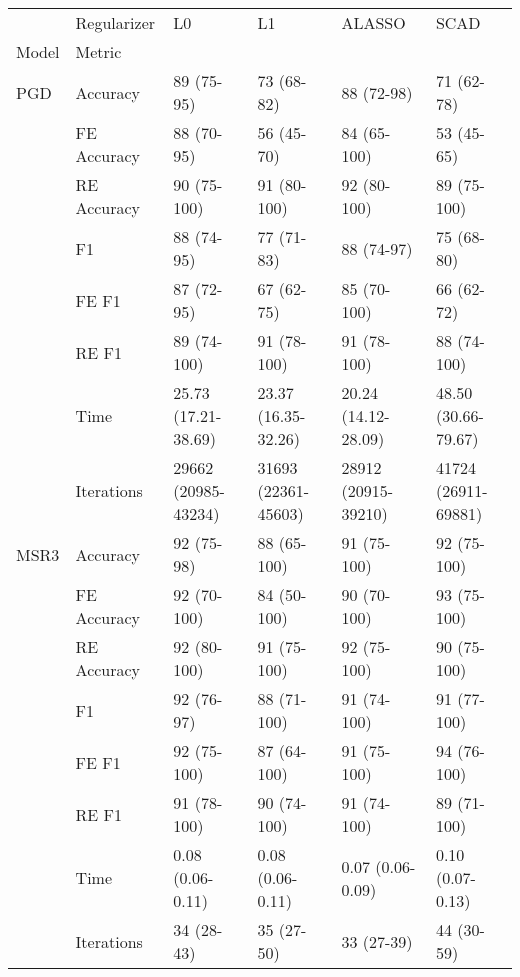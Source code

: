 \begin{tabular}{llllll}
\toprule
    & Regularizer &                   L0 &                   L1 &               ALASSO &                 SCAD \\
Model & Metric &                      &                      &                      &                      \\
\midrule
PGD & Accuracy &           89 (75-95) &           73 (68-82) &           88 (72-98) &           71 (62-78) \\
    & FE Accuracy &           88 (70-95) &           56 (45-70) &          84 (65-100) &           53 (45-65) \\
    & RE Accuracy &          90 (75-100) &          91 (80-100) &          92 (80-100) &          89 (75-100) \\
    & F1 &           88 (74-95) &           77 (71-83) &           88 (74-97) &           75 (68-80) \\
    & FE F1 &           87 (72-95) &           67 (62-75) &          85 (70-100) &           66 (62-72) \\
    & RE F1 &          89 (74-100) &          91 (78-100) &          91 (78-100) &          88 (74-100) \\
    & Time &  25.73 (17.21-38.69) &  23.37 (16.35-32.26) &  20.24 (14.12-28.09) &  48.50 (30.66-79.67) \\
    & Iterations &  29662 (20985-43234) &  31693 (22361-45603) &  28912 (20915-39210) &  41724 (26911-69881) \\
MSR3 & Accuracy &           92 (75-98) &          88 (65-100) &          91 (75-100) &          92 (75-100) \\
    & FE Accuracy &          92 (70-100) &          84 (50-100) &          90 (70-100) &          93 (75-100) \\
    & RE Accuracy &          92 (80-100) &          91 (75-100) &          92 (75-100) &          90 (75-100) \\
    & F1 &           92 (76-97) &          88 (71-100) &          91 (74-100) &          91 (77-100) \\
    & FE F1 &          92 (75-100) &          87 (64-100) &          91 (75-100) &          94 (76-100) \\
    & RE F1 &          91 (78-100) &          90 (74-100) &          91 (74-100) &          89 (71-100) \\
    & Time &     0.08 (0.06-0.11) &     0.08 (0.06-0.11) &     0.07 (0.06-0.09) &     0.10 (0.07-0.13) \\
    & Iterations &           34 (28-43) &           35 (27-50) &           33 (27-39) &           44 (30-59) \\
\bottomrule
\end{tabular}
